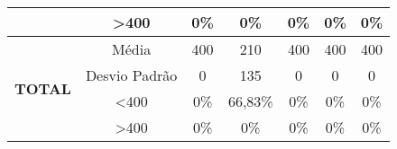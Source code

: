 \begin{table}[]
\begin{tabular}{|c|c|ccccc|}
                                & \textgreater 400 & 0\%            & 0\%            & 0\%            & 0\%            & 0\%            \\ \hline
\multirow{4}{*}{\textbf{TOTAL}} & Média            & 400               & 210               & 400               & 400               & 400               \\
                                & Desvio Padrão    & 0                 & 135               & 0                 & 0                 & 0                 \\
                                & \textless 400    & 0\%            & 66,83\%           & 0\%            & 0\%            & 0\%            \\
                                & \textgreater 400 & 0\%            & 0\%            & 0\%            & 0\%            & 0\%            \\ \hline
\end{tabular}
\end{table}
